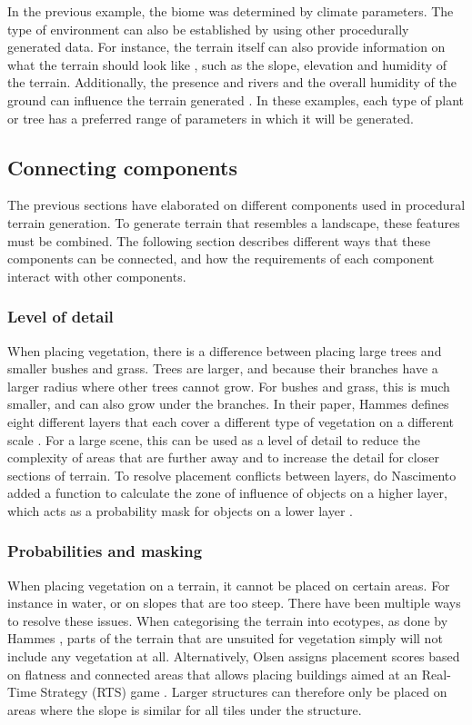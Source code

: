 \documentclass{article}
\begin{document}
In the previous example, the biome was determined by climate parameters. The type of environment can also be established by using other procedurally generated data. For instance, the terrain itself can also provide information on what the terrain should look like \cite{hammes_modeling_2001}, such as the slope, elevation and humidity of the terrain. Additionally, the presence and rivers and the overall humidity of the ground can influence the terrain generated \cite{do_nascimento_gpu-based_2018} \cite{van_muijden_gpu-based_2017}. In these examples, each type of plant or tree has a preferred range of parameters in which it will be generated.

\subsection{Connecting components}
The previous sections have elaborated on different components used in procedural terrain generation. To generate terrain that resembles a landscape, these features must be combined. The following section describes different ways that these components can be connected, and how the requirements of each component interact with other components.

\subsubsection{Level of detail}
When placing vegetation, there is a difference between placing large trees and smaller bushes and grass. Trees are larger, and because their branches have a larger radius where other trees cannot grow. For bushes and grass, this is much smaller, and can also grow under the branches. In their paper, Hammes defines eight different layers that each cover a different type of vegetation on a different scale \cite{hammes_modeling_2001}. For a large scene, this can be used as a level of detail to reduce the complexity of areas that are further away and to increase the detail for closer sections of terrain. To resolve placement conflicts between layers, do Nascimento added a function to calculate the zone of influence of objects on a higher layer, which acts as a probability mask for objects on a lower layer \cite{do_nascimento_gpu-based_2018}.

\subsubsection{Probabilities and masking}
When placing vegetation on a terrain, it cannot be placed on certain areas. For instance in water, or on slopes that are too steep. There have been multiple ways to resolve these issues. When categorising the terrain into ecotypes, as done by Hammes \cite{hammes_modeling_2001}, parts of the terrain that are unsuited for vegetation simply will not include any vegetation at all. Alternatively, Olsen assigns placement scores based on flatness and connected areas that allows placing buildings aimed at an Real-Time Strategy (RTS) game \cite{olsen_realtime_2004}. Larger structures can therefore only be placed on areas where the slope is similar for all tiles under the structure.
\end{document}
